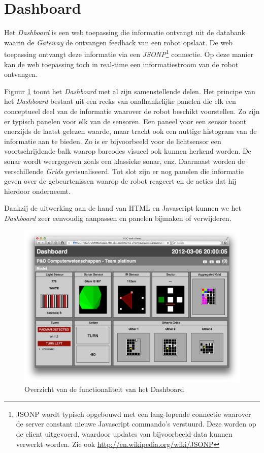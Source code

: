 \documentclass[12pt,a4paper]{report}
\begin{document}
\section{Dashboard}

Het \emph{Dashboard} is een web toepassing die informatie ontvangt uit de databank waarin de \emph{Gateway} de ontvangen feedback van een robot opslaat. De web toepassing ontvangt deze informatie via een \emph{JSONP}\footnote{JSONP wordt typisch opgebouwd met een lang-lopende connectie waarover de server constant nieuwe Javascript commando's verstuurd. Deze worden op de client uitgevoerd, waardoor updates van bijvoorbeeld data kunnen verwerkt worden. Zie ook \url{http://en.wikipedia.org/wiki/JSONP}} connectie. Op deze manier kan de web toepassing toch in real-time een informatiestroom van de robot ontvangen.

Figuur \ref{fig:dashboard_overview} toont het \emph{Dashboard} met al zijn samenstellende delen. Het principe van het \emph{Dashboard} bestaat uit een reeks van onafhankelijke panelen die elk een conceptueel deel van de informatie waarover de robot beschikt voorstellen. Zo zijn er typisch panelen voor elk van de sensoren. Een paneel voor een sensor toont enerzijds de laatst gelezen waarde, maar tracht ook een nuttige histogram van de informatie aan te bieden. Zo is er bijvoorbeeld voor de lichtsensor een voortschrijdende balk waarop barcodes visueel ook kunnen herkend worden. De sonar wordt weergegeven zoals een klassieke sonar, enz. Daarnaast worden de verschillende \emph{Grids} gevisualiseerd. Tot slot zijn er nog panelen die informatie geven over de gebeurtenissen waarop de robot reageert en de acties dat hij hierdoor onderneemt.

Dankzij de uitwerking aan de hand van HTML en Javascript kunnen we het \emph{Dashboard} zeer eenvoudig aanpassen en panelen bijmaken of verwijderen.

\begin{figure}[htbp]
  \centering
  \includegraphics[width=150mm]{resources/dashboard.png}
  \caption{Overzicht van de functionaliteit van het Dashboard}
  \label{fig:dashboard_overview}
\end{figure}
\end{document}
